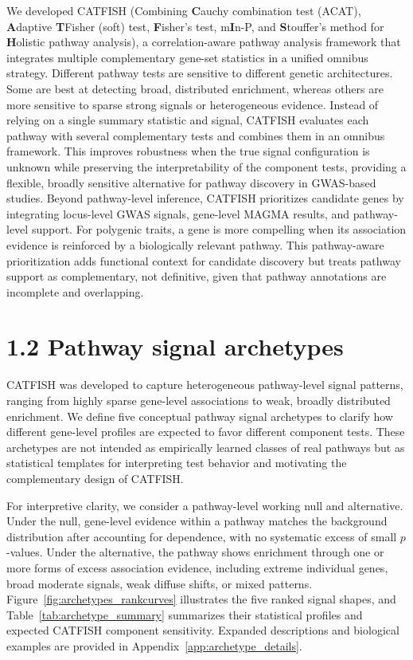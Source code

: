 \documentclass[unnumsec,webpdf,contemporary,large]{oup-authoring-template}%
\theoremstyle{thmstyleone}%
\theoremstyle{thmstyletwo}%
\theoremstyle{thmstylethree}%
\begin{document}
We developed CATFISH (Combining \textbf{C}auchy combination test (ACAT), \textbf{A}daptive \textbf{T}Fisher (soft) test, \textbf{F}isher's test, m\textbf{I}n-P, and \textbf{S}touffer's method for \textbf{H}olistic pathway analysis), a correlation-aware pathway analysis framework that integrates multiple complementary gene-set statistics in a unified omnibus strategy. Different pathway tests are sensitive to different genetic architectures. Some are best at detecting broad, distributed enrichment, whereas others are more sensitive to sparse strong signals or heterogeneous evidence. Instead of relying on a single summary statistic and signal, CATFISH evaluates each pathway with several complementary tests and combines them in an omnibus framework. This improves robustness when the true signal configuration is unknown while preserving the interpretability of the component tests, providing a flexible, broadly sensitive alternative for pathway discovery in GWAS-based studies. Beyond pathway-level inference, CATFISH prioritizes candidate genes by integrating locus-level GWAS signals, gene-level MAGMA results, and pathway-level support. For polygenic traits, a gene is more compelling when its association evidence is reinforced by a biologically relevant pathway. This pathway-aware prioritization adds functional context for candidate discovery but treats pathway support as complementary, not definitive, given that pathway annotations are incomplete and overlapping. 




\section*{1.2 Pathway signal archetypes}

CATFISH was developed to capture heterogeneous pathway-level signal patterns, ranging from highly sparse gene-level associations to weak, broadly distributed enrichment. We define five conceptual pathway signal archetypes to clarify how different gene-level profiles are expected to favor different component tests. These archetypes are not intended as empirically learned classes of real pathways but as statistical templates for interpreting test behavior and motivating the complementary design of CATFISH.

For interpretive clarity, we consider a pathway-level working null and alternative. Under the null, gene-level evidence within a pathway matches the background distribution after accounting for dependence, with no systematic excess of small \(p\)-values. Under the alternative, the pathway shows enrichment through one or more forms of excess association evidence, including extreme individual genes, broad moderate signals, weak diffuse shifts, or mixed patterns. Figure~\ref{fig:archetypes_rankcurves} illustrates the five ranked signal shapes, and Table~\ref{tab:archetype_summary} summarizes their statistical profiles and expected CATFISH component sensitivity. Expanded descriptions and biological examples are provided in Appendix~\ref{app:archetype_details}.
\end{document}
